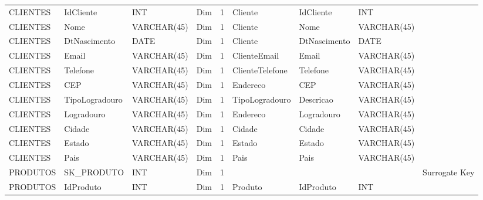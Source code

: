 \begin{landscape}
\begin{longtable}{l|l|l|l|l|l|l|l|l}
{\scriptsize{}CLIENTES} & {\scriptsize{}IdCliente} & {\scriptsize{}INT} & {\scriptsize{}Dim} & {\scriptsize{}1} & {\scriptsize{}Cliente} & {\scriptsize{}IdCliente} & {\scriptsize{}INT} & \tabularnewline
{\scriptsize{}CLIENTES} & {\scriptsize{}Nome} & {\scriptsize{}VARCHAR(45)} & {\scriptsize{}Dim} & {\scriptsize{}1} & {\scriptsize{}Cliente} & {\scriptsize{}Nome} & {\scriptsize{}VARCHAR(45)} & \tabularnewline
{\scriptsize{}CLIENTES} & {\scriptsize{}DtNascimento} & {\scriptsize{}DATE} & {\scriptsize{}Dim} & {\scriptsize{}1} & {\scriptsize{}Cliente} & {\scriptsize{}DtNascimento} & {\scriptsize{}DATE} & \tabularnewline
{\scriptsize{}CLIENTES} & {\scriptsize{}Email} & {\scriptsize{}VARCHAR(45)} & {\scriptsize{}Dim} & {\scriptsize{}1} & {\scriptsize{}ClienteEmail} & {\scriptsize{}Email} & {\scriptsize{}VARCHAR(45)} & \tabularnewline
{\scriptsize{}CLIENTES} & {\scriptsize{}Telefone} & {\scriptsize{}VARCHAR(45)} & {\scriptsize{}Dim} & {\scriptsize{}1} & {\scriptsize{}ClienteTelefone} & {\scriptsize{}Telefone} & {\scriptsize{}VARCHAR(45)} & \tabularnewline
{\scriptsize{}CLIENTES} & {\scriptsize{}CEP} & {\scriptsize{}VARCHAR(45)} & {\scriptsize{}Dim} & {\scriptsize{}1} & {\scriptsize{}Endereco} & {\scriptsize{}CEP} & {\scriptsize{}VARCHAR(45)} & \tabularnewline
{\scriptsize{}CLIENTES} & {\scriptsize{}TipoLogradouro} & {\scriptsize{}VARCHAR(45)} & {\scriptsize{}Dim} & {\scriptsize{}1} & {\scriptsize{}TipoLogradouro} & {\scriptsize{}Descricao} & {\scriptsize{}VARCHAR(45)} & \tabularnewline
{\scriptsize{}CLIENTES} & {\scriptsize{}Logradouro} & {\scriptsize{}VARCHAR(45)} & {\scriptsize{}Dim} & {\scriptsize{}1} & {\scriptsize{}Endereco} & {\scriptsize{}Logradouro} & {\scriptsize{}VARCHAR(45)} & \tabularnewline
{\scriptsize{}CLIENTES} & {\scriptsize{}Cidade} & {\scriptsize{}VARCHAR(45)} & {\scriptsize{}Dim} & {\scriptsize{}1} & {\scriptsize{}Cidade} & {\scriptsize{}Cidade} & {\scriptsize{}VARCHAR(45)} & \tabularnewline
{\scriptsize{}CLIENTES} & {\scriptsize{}Estado} & {\scriptsize{}VARCHAR(45)} & {\scriptsize{}Dim} & {\scriptsize{}1} & {\scriptsize{}Estado} & {\scriptsize{}Estado} & {\scriptsize{}VARCHAR(45)} & \tabularnewline
{\scriptsize{}CLIENTES} & {\scriptsize{}Pais} & {\scriptsize{}VARCHAR(45)} & {\scriptsize{}Dim} & {\scriptsize{}1} & {\scriptsize{}Pais} & {\scriptsize{}Pais} & {\scriptsize{}VARCHAR(45)} & \tabularnewline
{\scriptsize{}PRODUTOS} & {\scriptsize{}SK\_PRODUTO} & {\scriptsize{}INT} & {\scriptsize{}Dim} & {\scriptsize{}1} &  &  &  & {\scriptsize{}Surrogate Key}\tabularnewline
{\scriptsize{}PRODUTOS} & {\scriptsize{}IdProduto} & {\scriptsize{}INT} & {\scriptsize{}Dim} & {\scriptsize{}1} & {\scriptsize{}Produto} & {\scriptsize{}IdProduto} & {\scriptsize{}INT} & \tabularnewline

\end{longtable}
\end{landscape}
